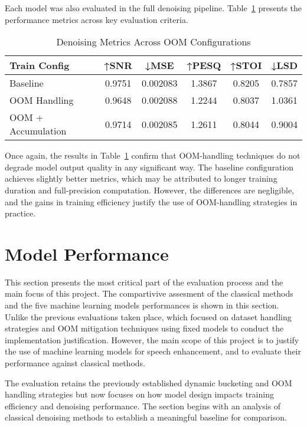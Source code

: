 Each model was also evaluated in the full denoising pipeline. Table~\ref{tab:oom_metrics} presents the performance metrics across key evaluation criteria.

\vspace{1em}
\begin{table}[H]
\centering
\caption{Denoising Metrics Across OOM Configurations}
\label{tab:oom_metrics}
\begin{tabular}{|l|c|c|c|c|c|}
\hline
\textbf{Train Config} & \textbf{↑SNR} & \textbf{↓MSE} & \textbf{↑PESQ} & \textbf{↑STOI} & \textbf{↓LSD} \\
\hline
Baseline               & 0.9751 & 0.002083 & 1.3867 & 0.8205 & 0.7857 \\
OOM Handling           & 0.9648 & 0.002088 & 1.2244 & 0.8037 & 1.0361 \\
OOM + Accumulation     & 0.9714 & 0.002085 & 1.2611 & 0.8044 & 0.9004 \\
\hline
\end{tabular}
\end{table}

Once again, the results in Table~\ref{tab:oom_metrics} confirm that OOM-handling techniques do not degrade model output quality in any significant way. The baseline configuration achieves slightly better metrics, which may be attributed to longer training duration and full-precision computation. However, the differences are negligible, and the gains in training efficiency justify the use of OOM-handling strategies in practice.


\section{Model Performance}
\label{sec:model_performance}

This section presents the most critical part of the evaluation process and the main focus of this project. The compartivive assesment of the classical methods and the five machine learning models performances is shown in this section. Unlike the previous evaluations taken place, which focused on dataset handling strategies and OOM mitigation techniques using fixed models to conduct the implementation justification. However, the main scope of this project is to justify the use of machine learning models for speech enhancement, and to evaluate their performance against classical methods.

The evaluation retains the previously established dynamic bucketing and OOM handling strategies but now focuses on how model design impacts training efficiency and denoising performance. The section begins with an analysis of classical denoising methods to establish a meaningful baseline for comparison.

